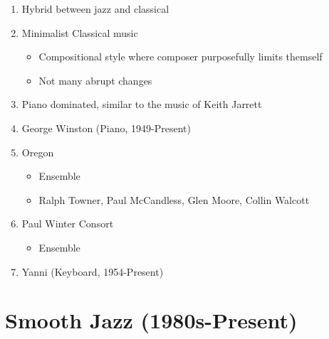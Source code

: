 \documentclass[]{article}
\providecommand{\tightlist}{%
  \setlength{\itemsep}{0pt}\setlength{\parskip}{0pt}}
\begin{document}
\begin{enumerate}
\def\labelenumi{\arabic{enumi}.}
\tightlist
\item
  Hybrid between jazz and classical
\item
  Minimalist Classical music

  \begin{itemize}
  \tightlist
  \item
    Compositional style where composer purposefully limits themself
  \item
    Not many abrupt changes
  \end{itemize}
\item
  Piano dominated, similar to the music of Keith Jarrett
\item
  George Winston (Piano, 1949-Present)
\item
  Oregon

  \begin{itemize}
  \tightlist
  \item
    Ensemble
  \item
    Ralph Towner, Paul McCandless, Glen Moore, Collin Walcott
  \end{itemize}
\item
  Paul Winter Consort

  \begin{itemize}
  \tightlist
  \item
    Ensemble
  \end{itemize}
\item
  Yanni (Keyboard, 1954-Present)
\end{enumerate}

\section{Smooth Jazz (1980s-Present)}\label{smooth-jazz-1980s-present}
\end{document}
